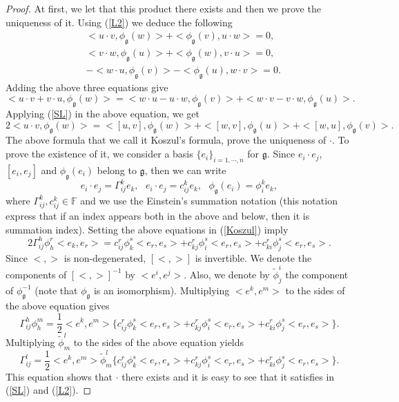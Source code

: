 \documentclass[10pt]{amsart}
\numberwithin{equation}{section}
\begin{document}
\begin{proof}
At first, we let that this product there exists and then we prove the uniqueness of it. Using (\ref{L2}) we deduce the following
\begin{align*}
&<u\cdot v,{ \phi_\mathfrak{g}}(w)>+<{ \phi_\mathfrak{g}}(v),u\cdot w>=0,\\
&<v\cdot w,{ \phi_\mathfrak{g}}(u)>+<{ \phi_\mathfrak{g}}(w), v\cdot u>=0,\\
&-<w\cdot u,{ \phi_\mathfrak{g}}(v)>-<{ \phi_\mathfrak{g}}(u), w\cdot v>=0.
\end{align*}
Adding the above three equations give
\[
<u\cdot v+v\cdot u, \phi_\mathfrak{g}(w)>=<w\cdot u-u\cdot w, \phi_\mathfrak{g}(v)>+<w\cdot v-v\cdot w, \phi_\mathfrak{g}(u)>.
\]
Applying (\ref{SL}) in the above equation, we get 
\begin{equation}\label{Koszul}
	2<u\cdot v,{ \phi_\mathfrak{g}}(w)>=<[u,v],{ \phi_\mathfrak{g}}(w)>+<[w,v],{ \phi_\mathfrak{g}}(u)>+<[w,u],{ \phi_\mathfrak{g}}(v)>.
\end{equation}
The above formula that we call it Koszul's formula, prove the uniqueness of $\cdot$. To prove the existence of it, we consider a basis $\{e_i\}_{i=1,\cdots, n}$ for $\mathfrak{g}$. Since $e_i\cdot e_j$, $[e_i, e_j]$ and $\phi_\mathfrak{g}(e_i)$ belong to $\mathfrak{g}$, then we can write 
\[
e_i\cdot e_j=\Gamma_{ij}^ke_k,\ \ \ e_i\cdot e_j=c_{ij}^ke_k,\ \ \  \phi_\mathfrak{g}(e_i)=\phi_i^ke_k,
\]
where $\Gamma_{ij}^k, c_{ij}^k\in\mathbb{F}$ and we use the Einstein's summation notation (this notation express that if an index appears both in the above and below, then it is summation index). Setting the above equations in (\ref{Koszul}) imply
\[
2\Gamma_{ij}^h\phi_h^r<e_k, e_r>=c_{ij}^r\phi^s_k<e_r, e_s>+c_{kj}^r\phi^s_i<e_r, e_s>+c_{ki}^r\phi^s_j<e_r, e_s>.
\]
Since $<,>$ is non-degenerated, $[<,>]$ is invertible. We denote the components of $[<,>]^{-1}$ by $<e^i, e^j>$. Also, we denote by $\widetilde{\phi}^i_j$ the component of $\phi_\mathfrak{g}^{-1}$ (note that $\phi_\mathfrak{g}$ is an isomorphism). Multiplying $<e^k, e^m>$ to the sides of the above equation gives
\[
\Gamma_{ij}^h\phi_h^m=\frac{1}{2}<e^k, e^m>\{c_{ij}^r\phi^s_k<e_r, e_s>+c_{kj}^r\phi^s_i<e_r, e_s>+c_{ki}^r\phi^s_j<e_r, e_s>\}.
\]
Multiplying $\widetilde{\phi}^l_m$ to the sides of the above equation yields
\[
\Gamma_{ij}^l=\frac{1}{2}<e^k, e^m>\widetilde{\phi}^l_m\{c_{ij}^r\phi^s_k<e_r, e_s>+c_{kj}^r\phi^s_i<e_r, e_s>+c_{ki}^r\phi^s_j<e_r, e_s>\}.
\]
This equation shows that $\cdot$ there exists and it is easy to see that it satisfies in (\ref{SL}) and (\ref{L2}).
\end{proof}
\end{document}
